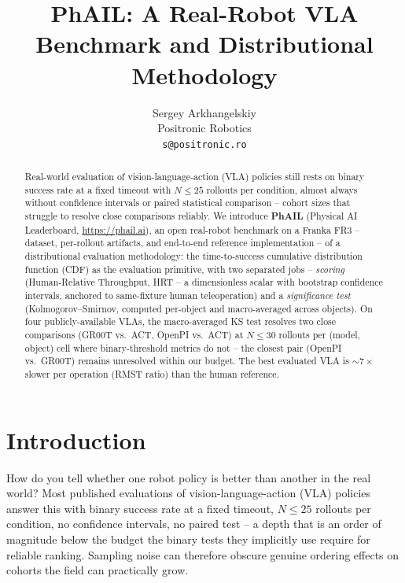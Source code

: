 \documentclass{article}
\title{PhAIL: A Real-Robot VLA Benchmark and Distributional Methodology}
\author{
  Sergey Arkhangelskiy \\
  Positronic Robotics \\
  \texttt{s@positronic.ro}
}
\date{}
\begin{document}
\maketitle

\begin{abstract}
Real-world evaluation of vision-language-action (VLA) policies still rests on binary success rate at a fixed timeout with $N \le 25$ rollouts per condition, almost always without confidence intervals or paired statistical comparison -- cohort sizes that struggle to resolve close comparisons reliably. We introduce \textbf{PhAIL} (Physical AI Leaderboard, \url{https://phail.ai}), an open real-robot benchmark on a Franka FR3 -- dataset, per-rollout artifacts, and end-to-end reference implementation -- of a distributional evaluation methodology: the time-to-success cumulative distribution function (CDF) as the evaluation primitive, with two separated jobs -- \emph{scoring} (Human-Relative Throughput, HRT -- a dimensionless scalar with bootstrap confidence intervals, anchored to same-fixture human teleoperation) and a \emph{significance test} (Kolmogorov--Smirnov, computed per-object and macro-averaged across objects). On four publicly-available VLAs, the macro-averaged KS test resolves two close comparisons (GR00T vs.\ ACT, OpenPI vs.\ ACT) at $N \le 30$ rollouts per (model, object) cell where binary-threshold metrics do not -- the closest pair (OpenPI vs.\ GR00T) remains unresolved within our budget. The best evaluated VLA is ${\sim}7\times$ slower per operation (RMST ratio) than the human reference.
\end{abstract}

\section{Introduction}\label{sec:intro}

How do you tell whether one robot policy is better than another in the real world? Most published evaluations of vision-language-action (VLA) policies answer this with binary success rate at a fixed timeout, $N \le 25$ rollouts per condition, no confidence intervals, no paired test -- a depth that is an order of magnitude below the budget the binary tests they implicitly use require for reliable ranking. Sampling noise can therefore obscure genuine ordering effects on cohorts the field can practically grow.
\end{document}
